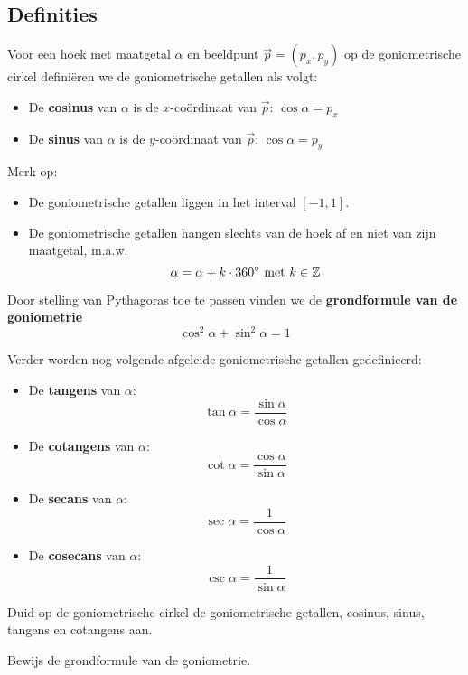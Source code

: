 \documentclass[twoside,a4paper,12pt]{article}
\begin{document}
\subsection{Definities}
Voor een hoek met maatgetal $\alpha$ en beeldpunt $\vec{p}=(p_x,p_y)$ op de goniometrische cirkel definiëren we de goniometrische getallen als volgt:

\begin{itemize}
  \item De {\bf cosinus} van $\alpha$ is de $x$-coördinaat van $\vec{p}$: $\cos\alpha=p_x$
  \item De {\bf sinus} van $\alpha$ is de $y$-coördinaat van $\vec{p}$: $\cos\alpha=p_y$
\end{itemize}

Merk op:
\begin{itemize}
  \item De goniometrische getallen liggen in het interval $[-1,1]$.
  \item De goniometrische getallen hangen slechts van de hoek af en niet van zijn maatgetal, m.a.w.
  $$\alpha = \alpha + k\cdot 360^\circ\mbox{ met }k\in\mathbb{Z}$$
\end{itemize}

Door stelling van Pythagoras toe te passen vinden we de {\bf grondformule van de goniometrie}
$$\cos^2\alpha + \sin^2\alpha = 1$$

Verder worden nog volgende afgeleide goniometrische getallen gedefinieerd:
\begin{itemize}
  \item De {\bf tangens} van $\alpha$:
  $$\tan\alpha=\dfrac{\sin\alpha}{\cos\alpha}$$
  \item De {\bf cotangens} van $\alpha$:
  $$\cot\alpha=\dfrac{\cos\alpha}{\sin\alpha}$$
  \item De {\bf secans} van $\alpha$:
  $$\sec\alpha=\dfrac{1}{\cos\alpha}$$
  \item De {\bf cosecans} van $\alpha$:
  $$\csc\alpha=\dfrac{1}{\sin\alpha}$$
\end{itemize}

\begin{oefening}
Duid op de goniometrische cirkel de goniometrische getallen, cosinus, sinus, tangens en cotangens aan.
\end{oefening}

\begin{oefening}
Bewijs de grondformule van de goniometrie.
\end{oefening}
\end{document}
